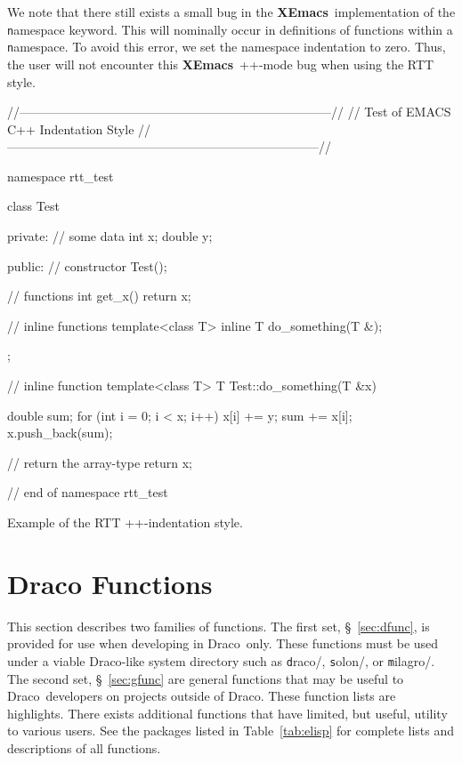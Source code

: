 \documentclass[11pt]{nmemo}
\newcommand{\comp}[1]{{\normalfont\texttt#1}}
\newcommand{\draco}{{\normalfont\sffamily Draco}}
\newcommand{\xemacs}{{\normalfont\bfseries XEmacs}}
\newenvironment{codeExample}
{\footnotesize 
  \VerbatimEnvironment
  \begin{SaveVerbatim}{\mycode}}%
  {\end{SaveVerbatim}%
  \noindent%
  \parashade[.950]{sharpcorners}{\gdef\outlineboxwidth{.5}%
    \UseVerbatim{\mycode}}\normalsize}
\begin{document}
We note that there still exists a small bug in the \xemacs\ 
implementation of the \comp{namespace} keyword.  This will nominally
occur in definitions of functions within a \comp{namespace}.  To avoid
this error, we set the namespace indentation to zero.  Thus, the user
will not encounter this \xemacs\ \C++-mode bug when using the RTT
style.

\begin{cxxSampleCode}
\begin{codeExample}
//---------------------------------------------------------------------------//
// Test of EMACS C++ Indentation Style
//---------------------------------------------------------------------------//

namespace rtt_test {

class Test
{
  private:
    // some data
    int x;
    double y;
    
  public:
    // constructor
    Test();
    
    // functions
    int get_x() { return x; }
    
    // inline functions
    template<class T> inline T do_something(T &);
};

// inline function
template<class T> T Test::do_something(T &x)
{
    double sum;
    for (int i = 0; i < x; i++)
    {
        x[i] += y;
        sum += x[i];
    }
    x.push_back(sum);
    
    // return the array-type
    return x;
}

} // end of namespace rtt_test

\end{codeExample}
\caption{Example of the RTT \C++-indentation style.}
\label{codeExample:samp1}
\end{cxxSampleCode}


\section{Draco Functions}
\label{sec:func}

This section describes two families of functions.  The first set,
\S~\ref{sec:dfunc}, is provided for use when developing in \draco\ 
only.  These functions must be used under a viable \draco-like system
directory such as \comp{draco/}, \comp{solon/}, or \comp{milagro/}.
The second set, \S~\ref{sec:gfunc} are general functions that may be
useful to \draco\ developers on projects outside of \draco.  These
function lists are highlights.  There exists additional functions that 
have limited, but useful, utility to various users.  See the packages
listed in Table~\ref{tab:elisp} for complete lists and descriptions of 
all functions.  
\end{document}
